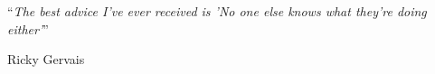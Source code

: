 \documentclass[
11pt, %
english, %
singlespacing, %
headsepline, %
]{MastersDoctoralThesis} %
\begin{document}

\vspace*{0.2\textheight}

\noindent\enquote{\itshape The best advice I've ever received is 'No one else knows what they're doing either'}\bigbreak

\hfill Ricky Gervais



\begin{abstract}
\addchaptertocentry{\abstractname} %

\end{abstract}






\begin{acknowledgements}
\addchaptertocentry{\acknowledgementname} %

\end{acknowledgements}




\end{document}
